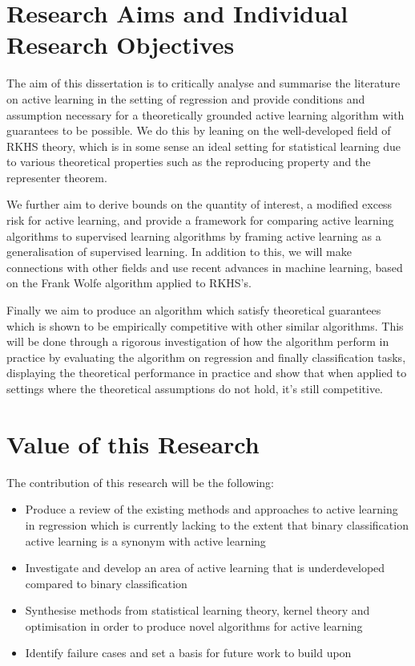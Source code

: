\section{Research Aims and Individual Research Objectives}
The aim of this dissertation is to critically analyse and summarise the
literature on active learning in the setting of regression and provide
conditions and assumption necessary for a theoretically grounded active learning
algorithm with guarantees to be possible. We do this by leaning on the
well-developed field of RKHS theory, which is in some sense an ideal setting for
statistical learning due to various theoretical properties such as the
reproducing property and the representer theorem.

We further aim to derive bounds on the quantity of interest, a modified excess
risk for active learning, and provide a framework for comparing active learning
algorithms to supervised learning algorithms by framing active learning as a
generalisation of supervised learning. In addition to this, we will make
connections with other fields and use recent advances in machine learning, based
on the Frank Wolfe algorithm applied to RKHS's.

Finally we aim to produce an algorithm which satisfy theoretical guarantees
which is shown to be empirically competitive with other similar algorithms. This
will be done through a rigorous investigation of how the algorithm perform in
practice by evaluating the algorithm on regression and finally classification
tasks, displaying the theoretical performance in practice and show that when
applied to settings where the theoretical assumptions do not hold, it's still
competitive.

\section{Value of this Research}
The contribution of this research will be the following:
\begin{itemize}
\item Produce a review of the existing methods and approaches to active learning in
  regression which is currently lacking to the extent that binary classification
  active learning is a synonym with active learning
\item Investigate and develop an area of active learning that is underdeveloped
  compared to binary classification
\item Synthesise methods from statistical learning theory, kernel theory and
  optimisation in order to produce novel algorithms for active learning
\item Identify failure cases and set a basis for future work to build upon
\end{itemize}